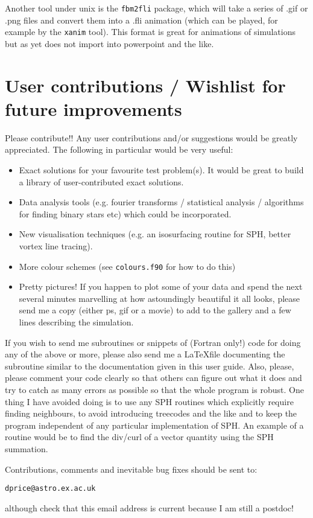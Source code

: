\documentclass[a4paper,12pt]{article}
\begin{document}
 Another tool under unix is the \verb+fbm2fli+ package, which will take a series of .gif or .png files and
convert them into a .fli animation (which can be played, for example by the \verb+xanim+ tool). This
format is great for animations of simulations but as yet does not import into powerpoint and the like.

\section{User contributions / Wishlist for future improvements}
 Please contribute!! Any user contributions and/or suggestions would be greatly
appreciated. The following in particular would be very useful:

\begin{itemize}
\item Exact solutions for your favourite test problem(s). It would be great to
build a library of user-contributed exact solutions.
\item Data analysis tools (e.g. fourier transforms / statistical analysis /
algorithms for finding binary stars etc) which could be incorporated.
\item New visualisation techniques (e.g. an isosurfacing routine for SPH, better
vortex line tracing).
\item More colour schemes (see \verb+colours.f90+ for how to do this)
\item Pretty pictures! If you happen to plot some of your data and spend the
next several minutes marvelling at how astoundingly beautiful it all looks, please send
me a copy (either ps, gif or a movie) to add to the gallery and a few lines
describing the simulation.
\end{itemize}


If you wish to send me subroutines or snippets of (Fortran only!) code for doing any of the above or
more, please also send me a \LaTeX file
documenting the subroutine similar to the documentation given in this user guide.
Also, please, please comment your code clearly so that others can figure out
what it does and try to catch as many errors as possible so that the whole
program is robust.  One thing I have avoided doing is to use any SPH
routines which explicitly require finding neighbours, to avoid introducing treecodes and
the like and to keep the program independent of any particular implementation of
SPH. An example of a
routine would be to find the div/curl of a vector quantity using
the SPH summation.

Contributions, comments and inevitable bug fixes
should be sent to:
\begin{verbatim}
dprice@astro.ex.ac.uk
\end{verbatim}
although check that this email address is current because I am still a postdoc!
\end{document}
